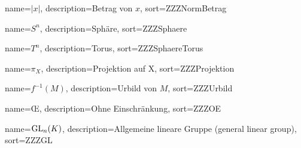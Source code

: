 {
  name={\ensuremath{| x |}},
  description={Betrag von $x$},
  sort=ZZZNormBetrag
}

{
  name={\ensuremath{S^n}},
  description={Sphäre},
  sort=ZZZSphaere
}

{
  name={\ensuremath{T^n}},
  description={Torus},
  sort=ZZZSphaereTorus
}

{
  name={\ensuremath{\pi_X}},
  description={Projektion auf X},
  sort=ZZZProjektion
}

{
  name={\ensuremath{f^{-1}(M)}},
  description={Urbild von $M$},
  sort=ZZZUrbild
}

{
  name={$\text{\OE}$},
  description={Ohne Einschränkung},
  sort=ZZZOE
}

{
  name={$\mathrm{GL}_n(K)$},
  description={Allgemeine lineare Gruppe (general linear group)},
  sort=ZZZGL
}

\renewcommand*{\glossaryname}{\glossarName}

\glsaddall
\printglossaries


